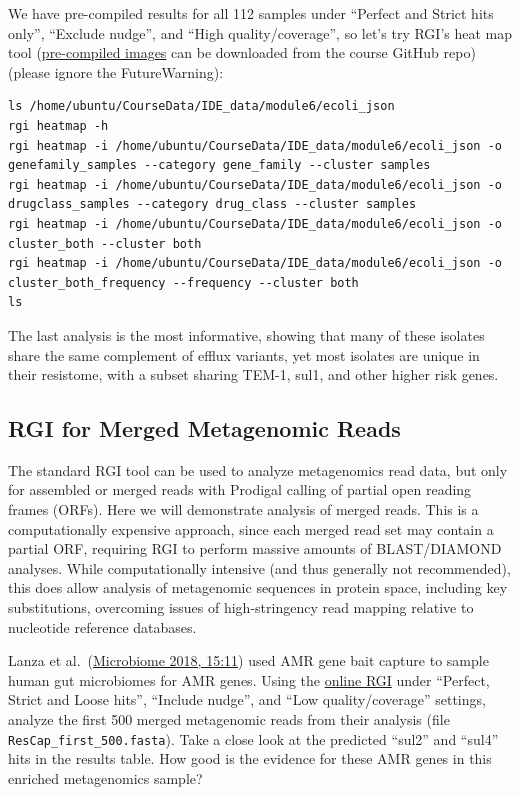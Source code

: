 \documentclass[
]{book}
\begin{document}
We have pre-compiled results for all 112 samples under ``Perfect and Strict hits only'', ``Exclude nudge'', and ``High quality/coverage'', so let's try RGI's heat map tool (\href{https://github.com/bioinformaticsdotca/IDE_2023/tree/main/module6/rgi_main_results}{pre-compiled images} can be downloaded from the course GitHub repo) (please ignore the FutureWarning):

\begin{verbatim}
ls /home/ubuntu/CourseData/IDE_data/module6/ecoli_json
rgi heatmap -h
rgi heatmap -i /home/ubuntu/CourseData/IDE_data/module6/ecoli_json -o genefamily_samples --category gene_family --cluster samples
rgi heatmap -i /home/ubuntu/CourseData/IDE_data/module6/ecoli_json -o drugclass_samples --category drug_class --cluster samples
rgi heatmap -i /home/ubuntu/CourseData/IDE_data/module6/ecoli_json -o cluster_both --cluster both
rgi heatmap -i /home/ubuntu/CourseData/IDE_data/module6/ecoli_json -o cluster_both_frequency --frequency --cluster both
ls
\end{verbatim}

The last analysis is the most informative, showing that many of these isolates share the same complement of efflux variants, yet most isolates are unique in their resistome, with a subset sharing TEM-1, sul1, and other higher risk genes.

\subsection{RGI for Merged Metagenomic Reads}\label{rgi-for-merged-metagenomic-reads}

The standard RGI tool can be used to analyze metagenomics read data, but only for assembled or merged reads with Prodigal calling of partial open reading frames (ORFs). Here we will demonstrate analysis of merged reads. This is a computationally expensive approach, since each merged read set may contain a partial ORF, requiring RGI to perform massive amounts of BLAST/DIAMOND analyses. While computationally intensive (and thus generally not recommended), this does allow analysis of metagenomic sequences in protein space, including key substitutions, overcoming issues of high-stringency read mapping relative to nucleotide reference databases.

Lanza et al.~(\href{https://www.ncbi.nlm.nih.gov/pubmed/29335005}{Microbiome 2018, 15:11}) used AMR gene bait capture to sample human gut microbiomes for AMR genes. Using the \href{https://card.mcmaster.ca/analyze/rgi}{online RGI} under ``Perfect, Strict and Loose hits'', ``Include nudge'', and ``Low quality/coverage'' settings, analyze the first 500 merged metagenomic reads from their analysis (file \texttt{ResCap\_first\_500.fasta}). Take a close look at the predicted ``sul2'' and ``sul4'' hits in the results table. How good is the evidence for these AMR genes in this enriched metagenomics sample?
\end{document}

